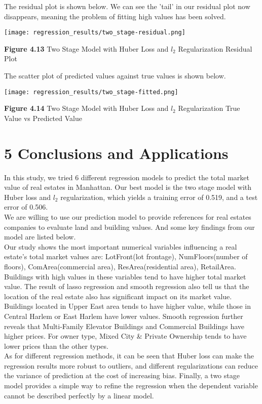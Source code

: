 \documentclass[9pt,twocolumn,twoside]{pnas-new}
\begin{document}
\noindent The residual plot is shown below. We can see the 'tail' in our residual plot now disappears, meaning the problem of fitting high values has been solved.

\texttt{[image: regression\_results/two\_stage-residual.png]} 
\begin{center}
\textbf{Figure 4.13} Two Stage Model with Huber Loss and $l_{2}$ Regularization Residual Plot
\end{center}

\noindent The scatter plot of predicted values against true values is shown below.

\texttt{[image: regression\_results/two\_stage-fitted.png]} 
\begin{center}
\textbf{Figure 4.14} Two Stage Model with Huber Loss and $l_{2}$ Regularization True Value vs Predicted Value 
\end{center}

\section*{5 Conclusions and Applications}

In this study, we tried 6 different regression models to predict the total market value of real estates in Manhattan. Our best model is the two stage model with Huber loss and $l_2$ regularization, which yields a training error of 0.519, and a test error of 0.506. \\
\linebreak
\noindent We are willing to use our prediction model to provide references for real estates companies to evaluate land and building values. And some key findings from our model are listed below.\\
\linebreak
\noindent Our study shows the most important numerical variables influencing a real estate's total market values are: LotFront(lot frontage), NumFloors(number of floors), ComArea(commercial area), ResArea(residential area), RetailArea. Buildings with high values in these variables tend to have higher total market value. The result of lasso regression and smooth regression also tell us that the location of the real estate also has significant impact on its market value. Buildings located in Upper East area tends to have higher value, while those in Central Harlem or East Harlem have lower values. Smooth regression further reveals that Multi-Family Elevator Buildings and Commercial Buildings have higher prices. For owner type, Mixed City \& Private Ownership tends to have lower prices than the other types.\\
\linebreak
\noindent As for different regression methods, it can be seen that Huber loss can make the regression results more robust to outliers, and different regularizations can reduce the variance of prediction at the cost of increasing bias. Finally, a two stage model provides a simple way to refine the regression when the dependent variable cannot be described perfectly by a linear model.\\
\end{document}
